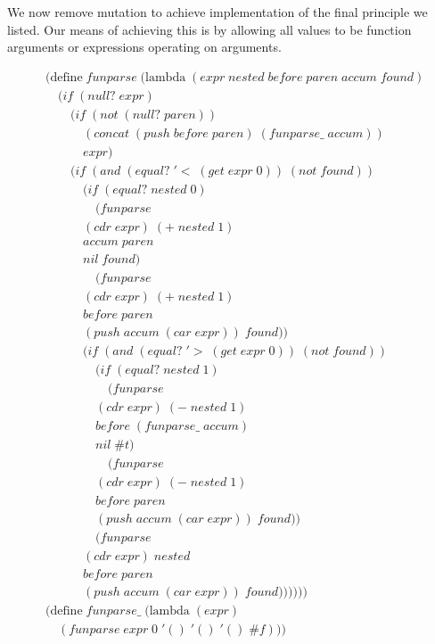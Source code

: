 We now remove mutation to achieve implementation of the final principle we listed. Our 
means of achieving this is by allowing all values to be function arguments or expressions 
operating on arguments.

\begin{align*}
& (\text{define} \; funparse \; (\text{lambda} \; (expr \; nested \; before \; paren \; accum \; found) \; 
\\& \quad (if \; (null? \; expr)
\\& \qquad (if \; (not \; (null? \; paren))
\\& \qquad \quad (concat \; (push \; before \; paren) \; (funparse\_ \; accum))
\\& \qquad \quad expr)
\\& \qquad (if \; (and \; (equal? \; '< \; (get \; expr \; 0)) \; (not \; found))
\\& \qquad \quad (if \; (equal? \; nested \; 0)
\\& \qquad \qquad (funparse \; 
\\& \qquad \quad (cdr \; expr) \; (+ \; nested \; 1) \; 
\\& \qquad \quad accum \; paren \; 
\\& \qquad \quad nil \; found)
\\& \qquad \qquad (funparse \; 
\\& \qquad \quad (cdr \; expr) \; (+ \; nested \; 1) \; 
\\& \qquad \quad before \; paren \; 
\\& \qquad \quad (push \; accum \; (car \; expr)) \; found))
\\& \qquad \quad (if \; (and \; (equal? \; '> \; (get \; expr \; 0)) \; (not \; found))
\\& \qquad \qquad (if \; (equal? \; nested \; 1)
\\& \qquad \qquad \quad (funparse \; 
\\& \qquad \qquad (cdr \; expr) \; (- \; nested \; 1) \; 
\\& \qquad \qquad before \; (funparse\_ \; accum) \; 
\\& \qquad \qquad nil \; \#t)
\\& \qquad \qquad \quad (funparse \; 
\\& \qquad \qquad (cdr \; expr) \; (- \; nested \; 1) \; 
\\& \qquad \qquad before \; paren \; 
\\& \qquad \qquad (push \; accum \; (car \; expr)) \; found))
\\& \qquad \qquad (funparse \; 
\\& \qquad \quad (cdr \; expr) \; nested \; 
\\& \qquad \quad before \; paren \; 
\\& \qquad \quad (push \; accum \; (car \; expr)) \; found))))))
\\& (\text{define} \; funparse\_ \; (\text{lambda} \; (expr)
\\& \quad (funparse \; expr \; 0 \; '() \; '() \; '() \; \#f))) \; 
\end{align*}

